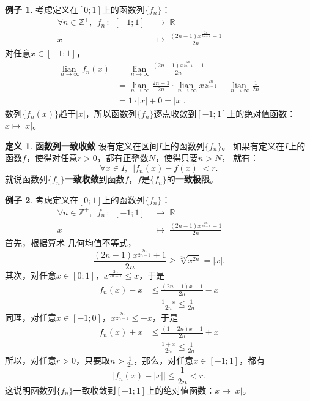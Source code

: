 \documentclass[12pt,UTF8]{ctexbook}
\newcommand{\lian}[1]{
    \underset{#1}{\operatorname{lian}\,}
}
\theoremstyle{definition}
\newtheorem{df}{定义}[section]
\newtheorem{ex}{例子}[section]
\theoremstyle{plain}
\begin{document}
\begin{ex}
    考虑定义在$[0;1]$上的函数列$\{f_n\}$：
    \begin{align*}
        \forall n\in \mathbb{Z}^+, \;\, f_n \,: \,\; [-1;1]\; &\rightarrow \; \mathbb{R} \\
        x \;&\mapsto \; \frac{(2n-1)x^{\frac{2n}{2n-1}} + 1}{2n} \qquad\qquad\phantom{9} 
    \end{align*}
    对任意$x\in [-1;1]$，
    \begin{align*}
        \lian{n\to\infty}f_n(x) &= \lian{n\to\infty} \frac{(2n-1)x^{\frac{2n}{2n-1}} + 1}{2n} \\
        &= \lian{n\to\infty} \frac{2n-1}{2n} \cdot\lian{n\to\infty} x^{\frac{2n}{2n-1}} + \lian{n\to\infty} \frac{1}{2n} \\
        &= 1 \cdot |x| + 0 = |x|. 
    \end{align*}
    数列$\{f_n(x)\}$趋于$|x|$，所以函数列$\{f_n\}$逐点收敛到$[-1;1]$上的绝对值函数：$x\mapsto |x|$。
\end{ex}

\begin{df}{\textbf{函数列一致收敛}}
    设有定义在区间$I$上的函数列$\{f_n\}$。
    如果有定义在$I$上的函数$f$，使得对任意$r>0$，都有正整数$N$，使得只要$n>N$，
    就有：
    $$ \forall x\in I, \,\,\,|f_n(x) - f(x) | < r.$$
    就说函数列$\{f_n\}$\textbf{一致收敛}到函数$f$，$f$是$\{f_n\}$的\textbf{一致极限}。
\end{df}

\begin{ex}
    考虑定义在$[0;1]$上的函数列$\{f_n\}$：
    \begin{align*}
        \forall n\in \mathbb{Z}^+, \;\, f_n \,: \,\; [-1;1]\; &\rightarrow \; \mathbb{R} \\
        x \;&\mapsto \; \frac{(2n-1)x^{\frac{2n}{2n-1}} + 1}{2n} \qquad\qquad\phantom{9} 
    \end{align*}
    首先，根据算术-几何均值不等式，
    $$\frac{(2n-1)x^{\frac{2n}{2n-1}} + 1}{2n} \geqslant \sqrt[2n]{x^{2n}} = |x|.$$
    其次，对任意$x\in [0;1]$，$x^{\frac{2n}{2n-1}} \leqslant x$，于是
    \begin{align*}
        f_n(x) - x &\leqslant \frac{(2n-1)x + 1}{2n} - x \\
        &= \frac{1 - x}{2n} \leqslant \frac{1}{2n}
    \end{align*}
    同理，对任意$x\in [-1;0]$，$x^{\frac{2n}{2n-1}} \leqslant -x$，于是
    \begin{align*}
        f_n(x) + x &\leqslant \frac{(1 - 2n)x + 1}{2n} + x \\
        &= \frac{1 + x}{2n} \leqslant \frac{1}{2n}
    \end{align*}
    所以，对任意$r>0$，只要取$n> \frac{1}{2r}$，那么，对任意$x\in [-1;1]$，都有
    $$\Big|f_n(x) - |x|\Big| \leqslant \frac{1}{2n} < r. $$
    这说明函数列$\{f_n\}$一致收敛到$[-1;1]$上的绝对值函数：$x\mapsto |x|$。
\end{ex}
\end{document}
